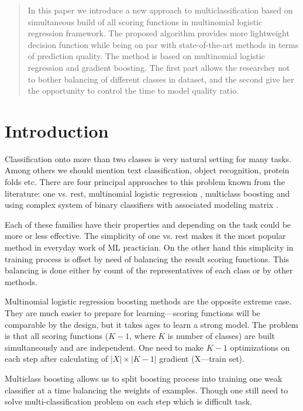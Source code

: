 \documentclass{article}
\begin{document}
\begin{abstract} 
In this paper we introduce a new approach to multiclassification based on simultaneous build of all scoring functions in multinomial logistic regression framework. The proposed algorithm provides more lightweight decision function while being on par with state-of-the-art methods in terms of prediction quality. The method is based on multinomial logistic regression and gradient boosting. The first part allows the researcher not to bother balancing of different classes in dataset, and the second give her the opportunity to control the time to model quality ratio.
\end{abstract} 

\section{Introduction}
\label{introduction}
Classification onto more than two classes is very natural setting for many tasks. Among others we should mention text classification, object recognition, protein folds etc. There are four principal approaches to this problem known from the literature: one vs. rest, multinomial logistic regression \cite{GLM}, multiclass boosting \cite{journals/jmlr/MukherjeeS13} and using complex system of binary classifiers with associated modeling matrix \cite{Allwein00reducingmulticlass}.

Each of these families have their properties and depending on the task could be more or less effective. The simplicity of one vs. rest makes it the most popular method in everyday work of ML practician. On the other hand this simplicity in training process is offset by need of balancing the result scoring functions. This balancing is done either by count of the representatives of each class or by other methods.

Multinomial logistic regression boosting methods are the opposite extreme case. They are much easier to prepare for learning---scoring functions will be comparable by the design, but it takes ages to learn a strong model. The problem is that all scoring functions ($K-1$, where $K$ is number of classes) are built simultaneously and are independent. One need to make $K-1$ optimizations on each step after calculating of $|X|\times |K - 1|$ gradient (X---train set).

Multiclass boosting allows us to split boosting process into training one weak classifier at a time balancing the weights of examples. Though one still need to solve multi-classification problem on each step which is difficult task. 
\end{document}
